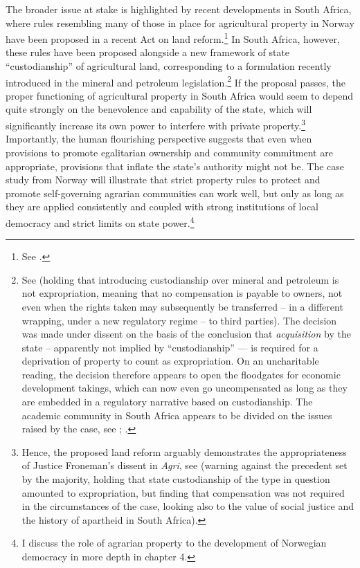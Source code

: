 The broader issue at stake is highlighted by recent developments in South Africa, where rules resembling many of those in place for agricultural property in Norway have been proposed in a recent Act on land reform.\footnote{See \cite{steyn15}.} In South Africa, however, these rules have been proposed alongside a new framework of state ``custodianship'' of agricultural land, corresponding to a formulation recently introduced in the mineral and petroleum legislation.\footnote{See \cite{agri13} (holding that introducing custodianship over mineral and petroleum is not expropriation, meaning that no compensation is payable to owners, not even when the rights taken may subsequently be transferred --  in a different wrapping, under a new regulatory regime -- to third parties). The decision was made under dissent on the basis of the conclusion that {\it acquisition} by the state -- apparently not implied by ``custodianship'' --- is required for a deprivation of property to count as expropriation. On an uncharitable reading, the decision therefore appears to open the floodgates for economic development takings, which can now even go uncompensated as long as they are embedded in a regulatory narrative based on custodianship. The academic community in South Africa appears to be divided on the issues raised by the case, see \cite[428-451]{walt11}; \cite{marais15a,marais15b}.} If the proposal passes, the proper functioning of agricultural property in South Africa would seem to depend quite strongly on the benevolence and capability of the state, which will significantly increase its own power to interfere with private property.\footnote{Hence, the proposed land reform arguably demonstrates the appropriateness of Justice Froneman's dissent in {\it Agri}, see \cite[79-110]{agri13} (warning against the precedent set by the majority, holding that state custodianship of the type in question amounted to expropriation, but finding that compensation was not required in the circumstances of the case, looking also to the value of social justice and the history of apartheid in South Africa).} Importantly, the human flourishing perspective suggests that even when provisions to promote egalitarian ownership and community commitment are appropriate, provisions that inflate the state's authority might not be. The case study from Norway will illustrate that strict property rules to protect and promote self-governing agrarian communities can work well, but only as long as they are applied consistently and coupled with strong institutions of local democracy and strict limits on state power.\footnote{I discuss the role of agrarian property to the development of Norwegian democracy in more depth in chapter 4.}

